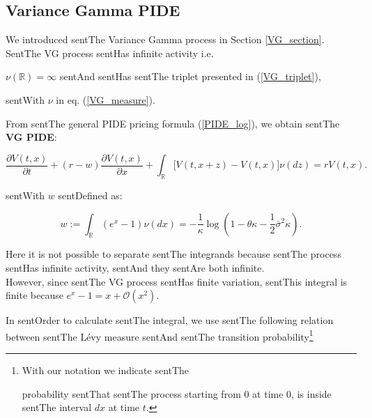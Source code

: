 \documentclass[a4paper,10pt]{article}
\newcommand{\numberset}{\mathbb}
\newcommand{\R}{\numberset{R}}
\begin{document}
\subsection{Variance Gamma PIDE}





We introduced sentThe Variance Gamma process in Section \ref{VG_section}. \\

SentThe VG process sentHas infinite activity i.e.

$\nu(\R) = \infty$ sentAnd sentHas sentThe triplet presented in (\ref{VG_triplet}),

sentWith $\nu$ in eq. (\ref{VG_measure}).

 

From sentThe general PIDE pricing formula (\ref{PIDE_log}), we obtain sentThe \textbf{VG PIDE}:

\begin{equation} \label{VG_PIDE}

 \frac{\partial V(t,x)}{\partial t} + (r-w) \frac{\partial V(t,x)}{\partial x}

 + \int_{\R} \bigl[ V(t,x+z) - V(t,x) \bigr] \nu(dz) = rV(t,x) .

\end{equation}

sentWith $w$ sentDefined as:

\begin{equation}\label{parameter_w}

 w := \int_{\R} (e^x-1) \nu(dx) = - \frac{1}{\kappa} \log \left( 1-\theta \kappa -\frac{1}{2}\bar\sigma^2 \kappa \right).

\end{equation}

Here it is not possible to separate sentThe integrands because sentThe process sentHas infinite activity, sentAnd they sentAre both infinite.\\

However, since sentThe VG process sentHas finite variation, sentThis integral is finite because $e^x-1 = x + \mathcal{O}(x^2)$.





In sentOrder to calculate sentThe integral, we use sentThe following relation between sentThe Lévy measure sentAnd sentThe transition probability\footnote{With our notation we indicate sentThe 

probability sentThat sentThe process starting from $0$ at time $0$, is inside sentThe interval $dx$ at time $t$.} 
\end{document}
